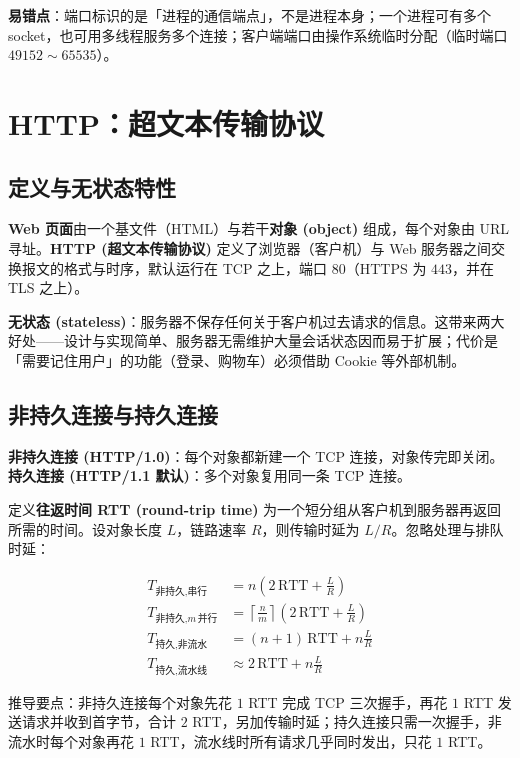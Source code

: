 \noindent\textbf{易错点}：端口标识的是「进程的通信端点」，不是进程本身；一个进程可有多个 socket，也可用多线程服务多个连接；客户端端口由操作系统临时分配（临时端口 $49152\sim65535$）。

\section{HTTP：超文本传输协议}

\subsection{定义与无状态特性}

\textbf{Web 页面}由一个基文件（HTML）与若干\textbf{对象 (object)} 组成，每个对象由 URL 寻址。\textbf{HTTP (超文本传输协议)} 定义了浏览器（客户机）与 Web 服务器之间交换报文的格式与时序，默认运行在 TCP 之上，端口 $80$（HTTPS 为 $443$，并在 TLS 之上）。

\textbf{无状态 (stateless)}：服务器不保存任何关于客户机过去请求的信息。这带来两大好处——设计与实现简单、服务器无需维护大量会话状态因而易于扩展；代价是「需要记住用户」的功能（登录、购物车）必须借助 Cookie 等外部机制。

\subsection{非持久连接与持久连接}

\textbf{非持久连接 (HTTP/1.0)}：每个对象都新建一个 TCP 连接，对象传完即关闭。\textbf{持久连接 (HTTP/1.1 默认)}：多个对象复用同一条 TCP 连接。

定义\textbf{往返时间 RTT (round-trip time)} 为一个短分组从客户机到服务器再返回所需的时间。设对象长度 $L$，链路速率 $R$，则传输时延为 $L/R$。忽略处理与排队时延：

\begin{align}
    T_{\text{非持久,串行}} &= n\left(2\,\text{RTT} + \frac{L}{R}\right) \\
    T_{\text{非持久,}m\,\text{并行}} &= \left\lceil \frac{n}{m} \right\rceil \left(2\,\text{RTT} + \frac{L}{R}\right) \\
    T_{\text{持久,非流水}} &= (n+1)\,\text{RTT} + n\frac{L}{R} \\
    T_{\text{持久,流水线}} &\approx 2\,\text{RTT} + n\frac{L}{R}
\end{align}

推导要点：非持久连接每个对象先花 $1$ RTT 完成 TCP 三次握手，再花 $1$ RTT 发送请求并收到首字节，合计 $2$ RTT，另加传输时延；持久连接只需一次握手，非流水时每个对象再花 $1$ RTT，流水线时所有请求几乎同时发出，只花 $1$ RTT。

